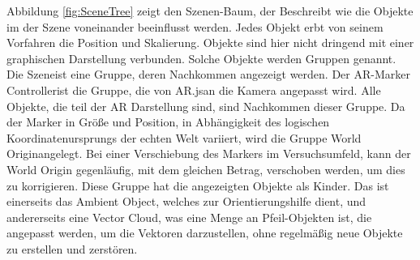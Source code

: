 Abbildung \ref{fig:SceneTree} zeigt den Szenen-Baum, der
Beschreibt wie die Objekte im der Szene voneinander beeinflusst
werden. Jedes Objekt erbt von seinem Vorfahren die Position und
Skalierung. Objekte sind hier nicht dringend mit einer graphischen
Darstellung verbunden. Solche Objekte werden \grqq Gruppen\grqq\space
genannt. Die \grqq Szene\grqq\space ist eine Gruppe, deren Nachkommen
angezeigt werden. Der \grqq AR-Marker Controller\grqq\space ist die
Gruppe, die von \grqq AR.js\grqq\space an die Kamera angepasst wird.
Alle Objekte, die teil der AR Darstellung sind, sind Nachkommen dieser
Gruppe. Da der Marker in Größe und Position, in Abhängigkeit des
logischen Koordinatenursprungs der echten Welt variiert, wird die
Gruppe \grqq World Origin\grqq\space angelegt. Bei einer Verschiebung
des Markers im Versuchsumfeld, kann der \grqq World Origin\grqq\space
gegenläufig, mit dem gleichen Betrag, verschoben werden, um dies zu
korrigieren. Diese Gruppe hat die angezeigten Objekte als Kinder.
Das ist einerseits das \grqq Ambient Object\grqq , welches zur
Orientierungshilfe dient, und andererseits eine \grqq Vector
Cloud\grqq , was eine Menge an Pfeil-Objekten ist, die angepasst
werden, um die Vektoren darzustellen, ohne regelmäßig neue Objekte
zu erstellen und zerstören.

%	
%



